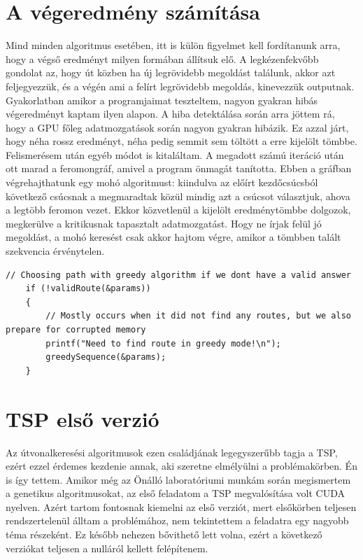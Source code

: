 \section{A végeredmény számítása}
\label{sec:getResult}
Mind minden algoritmus esetében, itt is külön figyelmet kell fordítanunk arra, hogy a végső eredményt milyen formában állítsuk elő. A legkézenfekvőbb gondolat az, hogy út közben ha új legrövidebb megoldást találunk, akkor azt feljegyezzük, és a végén ami a felírt legrövidebb megoldás, kinevezzük outputnak. Gyakorlatban amikor a programjaimat teszteltem, nagyon gyakran hibás végeredményt kaptam ilyen alapon. A hiba detektálása során arra jöttem rá, hogy a GPU főleg adatmozgatások során nagyon gyakran hibázik. Ez azzal járt, hogy néha rossz eredményt, néha pedig semmit sem töltött a erre kijelölt tömbbe. Felismerésem után egyéb módot is kitaláltam. A megadott számú iteráció után ott marad a feromongráf, amivel a program önmagát tanította. Ebben a gráfban végrehajthatunk egy mohó algoritmust: kiindulva az előírt kezdőcsúcsból következő csúcsnak a megmaradtak közül mindig azt a csúcsot választjuk, ahova a legtöbb feromon vezet. Ekkor közvetlenül a kijelölt eredménytömbbe dolgozok, megkerülve a kritikusnak tapasztalt adatmozgatást. Hogy ne írjak felül jó megoldást, a mohó keresést csak akkor hajtom végre, amikor a tömbben talált szekvencia érvénytelen.

\begin{lstlisting}[style=CStyle,showstringspaces=false]
	// Choosing path with greedy algorithm if we dont have a valid answer
	if (!validRoute(&params)) 
	{
		// Mostly occurs when it did not find any routes, but we also prepare for corrupted memory
		printf("Need to find route in greedy mode!\n");
		greedySequence(&params);
	}
\end{lstlisting}


\section{TSP első verzió} \label{TSP_v1_SubSection}
Az útvonalkeresési algoritmusok ezen családjának legegyszerűbb tagja a TSP, ezért ezzel érdemes kezdenie annak, aki szeretne elmélyülni a problémakörben. Én is így tettem. Amikor még az Önálló laboratóriumi munkám során megismertem a genetikus algoritmusokat, az első feladatom a TSP megvalósítása volt CUDA nyelven. Azért tartom fontosnak kiemelni az első verziót, mert elsőkörben teljesen rendszertelenül álltam a problémához, nem tekintettem a feladatra egy nagyobb téma részeként. Ez később nehezen bővithető lett volna, ezért a következő verziókat teljesen a nulláról kellett felépítenem.

